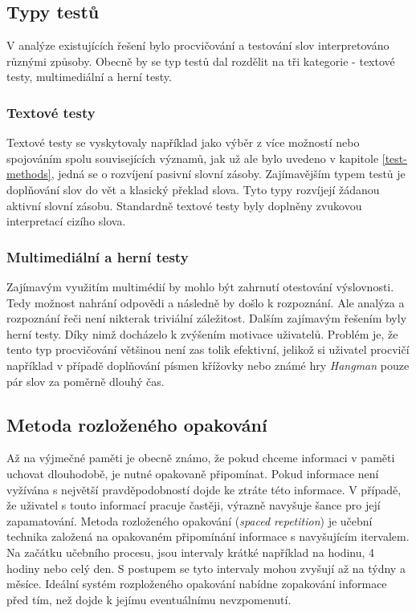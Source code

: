 \documentclass[a4paper,11pt,titlepage,fleqn]{article}
\begin{document}
        \subsection{Typy testů}

            V analýze existujících řešení bylo procvičování a testování slov interpretováno různými způsoby. Obecně by se typ testů dal rozdělit na tři kategorie - textové testy, multimediální a herní testy.

            \subsubsection{Textové testy}
                Textové testy se vyskytovaly například jako výběr z více možností nebo spojováním spolu souvisejících významů, jak už ale bylo uvedeno v kapitole \ref{test-methods}, jedná se o rozvíjení pasivní slovní zásoby. Zajímavějším typem testů je doplňování slov do vět a klasický překlad slova. Tyto typy rozvíjejí žádanou aktivní slovní zásobu. Standardně textové testy byly doplněny zvukovou interpretací cizího slova.

            \subsubsection{Multimediální a herní testy}
                Zajímavým využitím multimédií by mohlo být zahrnutí otestování výslovnosti. Tedy možnost nahrání odpovědi a následně by došlo k rozpoznání. Ale analýza a rozpoznání řeči není nikterak triviální záležitost. Dalším zajímavým řešením byly herní testy. Díky nimž docházelo k zvýšením motivace uživatelů. Problém je, že tento typ procvičování většinou není zas tolik efektivní, jelikož si uživatel procvičí například v případě doplňování písmen křížovky nebo známé hry \textit{Hangman} pouze pár slov za poměrně dlouhý čas.

        \subsection{Metoda rozloženého opakování}
            \label{spaced-repetition}
            Až na výjmečné paměti je obecně známo, že pokud chceme informaci v paměti uchovat dlouhodobě, je nutné opakovaně připomínat. Pokud informace není vyžívána s největší pravděpodobností dojde ke ztráte této informace. V případě, že uživatel s touto informací pracuje častěji, výrazně navyšuje šance pro její zapamatování. Metoda rozloženého opakování (\textit{spaced repetition}) je učební technika založená na opakovaném připomínání informace s navyšujícím itervalem. Na začátku učebního procesu, jsou intervaly krátké například na hodinu, 4 hodiny nebo celý den. S postupem se tyto intervaly mohou zvyšují až na týdny a měsíce. Ideální systém rozploženého opakování nabídne zopakování informace před tím, než dojde k jejímu eventuálnímu nevzpomenutí.
\end{document}
